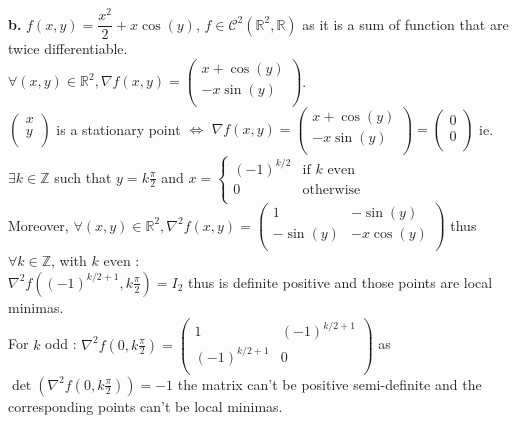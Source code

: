 \documentclass{article}
\begin{document}
\textbf{b.} $f(x,y) = \dfrac{x^2}{2}+x\cos(y)$, $f\in\mathcal{C}^2(\mathbb{R}^2,\mathbb{R})$ as it is a sum of function that are twice differentiable.
\\
$\forall (x,y)\in\mathbb{R}^2, \nabla f(x,y) = \left(\begin{array}{c}
    x+\cos(y)\\
    -x\sin(y)\\
\end{array}\right)$.
\\
$\left(\begin{array}{c}
    x\\
    y\\
\end{array}\right)$ is a stationary point $\Leftrightarrow$ $\nabla f(x,y) = \left(\begin{array}{c}
    x+\cos(y)\\
    -x\sin(y)\\
\end{array}\right) = \left(\begin{array}{c}
    0\\
    0\\
\end{array}\right)$ ie. $\exists k \in \mathbb{Z}$ such that $y = k\frac{\pi}{2}$ and $x = \left\{\begin{array}{cl}
    (-1)^{k/2}&\text{if $k$ even}\\
    0&\text{otherwise}\\
\end{array}\right.$\\
Moreover, $\forall (x,y)\in\mathbb{R}^2, \nabla^2f(x,y) = \left(\begin{array}{cc}
    1& -\sin(y)\\
    -\sin(y)&-x\cos(y)\\
\end{array}\right)$ thus $\forall k\in \mathbb{Z}$, with $k$ even :
\\
$\nabla^2f((-1)^{k/2+1},k\frac{\pi}{2}) = I_2$ thus is definite positive and those points are local minimas.
\\
For $k$ odd : $\nabla^2f(0,k\frac{\pi}{2}) = \left(\begin{array}{cc}
    1&(-1)^{k/2+1}\\
    (-1)^{k/2+1}&0\\
\end{array}\right)$ as $\det(\nabla^2f(0,k\frac{\pi}{2})) = -1$ the matrix can't be positive semi-definite and the corresponding points can't be local minimas.
\end{document}
